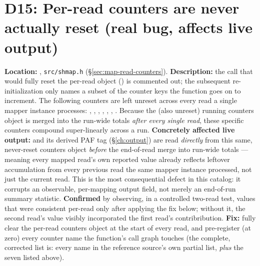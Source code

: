 \section{D15: Per-read counters are never actually reset (real bug, affects live output)}
\label{sec:d15}
\textbf{Location:} , \texttt{src/shmap.h} (\S\ref{sec:map-read-counters}).
\textbf{Description:} the call that would fully reset the per-read  object
() is commented out; the subsequent re-initialization only names a subset of the
counter keys the function goes on to increment. The following counters are left unreset across
every read a single mapper instance processes: , ,
, , , ,
. Because the (also unreset) running counters object is merged into the
run-wide totals \emph{after every single read}, these specific counters compound
super-linearly across a run. \textbf{Concretely affected live output:} 
and its derived  PAF tag (\S\ref{ch:output}) are read \emph{directly}
from this same, never-reset counters object \emph{before} the end-of-read merge into run-wide
totals --- meaning every mapped read's own reported  value already
reflects leftover accumulation from every previous read the same mapper instance processed, not
just the current read. This is the most consequential defect in this catalog: it corrupts an
observable, per-mapping output field, not merely an end-of-run summary statistic.
\textbf{Confirmed} by observing, in a controlled two-read test,  values
that were consistent per-read only after applying the fix below; without it, the second read's
value visibly incorporated the first read's contribribution. \textbf{Fix:} fully clear the
per-read counters object at the start of every read, and pre-register (at zero) every counter
name the function's call graph touches (the complete, corrected list is: every name in the
reference source's own partial list, \emph{plus} the seven listed above).

